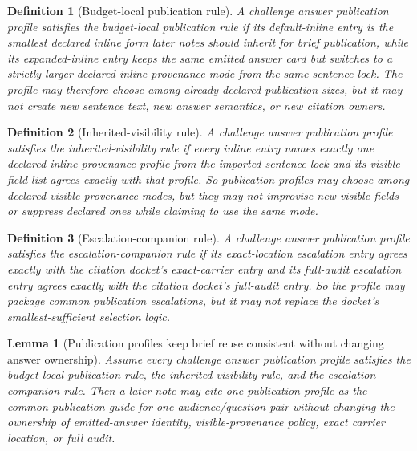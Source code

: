 \documentclass[11pt]{article}
\newtheorem{definition}{Definition}
\newtheorem{lemma}{Lemma}
\begin{document}
\begin{definition}[Budget-local publication rule]
A challenge answer publication profile satisfies the \emph{budget-local publication rule} if its default-inline entry is the smallest declared inline form later notes should inherit for brief publication, while its expanded-inline entry keeps the same emitted answer card but switches to a strictly larger declared inline-provenance mode from the same sentence lock.
The profile may therefore choose among already-declared publication sizes, but it may not create new sentence text, new answer semantics, or new citation owners.
\end{definition}

\begin{definition}[Inherited-visibility rule]
A challenge answer publication profile satisfies the \emph{inherited-visibility rule} if every inline entry names exactly one declared inline-provenance profile from the imported sentence lock and its visible field list agrees exactly with that profile.
So publication profiles may choose among declared visible-provenance modes, but they may not improvise new visible fields or suppress declared ones while claiming to use the same mode.
\end{definition}

\begin{definition}[Escalation-companion rule]
A challenge answer publication profile satisfies the \emph{escalation-companion rule} if its exact-location escalation entry agrees exactly with the citation docket's exact-carrier entry and its full-audit escalation entry agrees exactly with the citation docket's full-audit entry.
So the profile may package common publication escalations, but it may not replace the docket's smallest-sufficient selection logic.
\end{definition}

\begin{lemma}[Publication profiles keep brief reuse consistent without changing answer ownership]
Assume every challenge answer publication profile satisfies the budget-local publication rule, the inherited-visibility rule, and the escalation-companion rule.
Then a later note may cite one publication profile as the common publication guide for one audience/question pair without changing the ownership of emitted-answer identity, visible-provenance policy, exact carrier location, or full audit.
\end{lemma}
\end{document}
